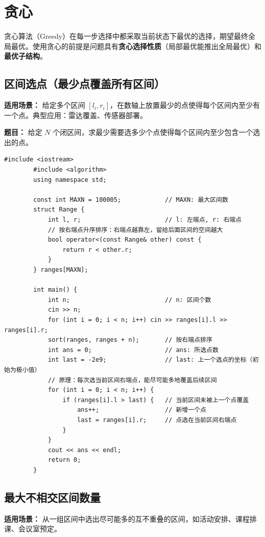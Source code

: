 \documentclass[12pt,a4paper]{ctexart}
\begin{document}
	\newpage
	
	\section{贪心}
	贪心算法（Greedy）在每一步选择中都采取当前状态下最优的选择，期望最终全局最优。使用贪心的前提是问题具有\textbf{贪心选择性质}（局部最优能推出全局最优）和\textbf{最优子结构}。
	
	\subsection{区间选点（最少点覆盖所有区间）}
	\textbf{适用场景：} 给定多个区间 $[l_i, r_i]$，在数轴上放置最少的点使得每个区间内至少有一个点。典型应用：雷达覆盖、传感器部署。
	
	\textbf{题目：} 给定 $N$ 个闭区间，求最少需要选多少个点使得每个区间内至少包含一个选出的点。
	
	\begin{lstlisting}[caption={贪心——按右端点排序，每次选右端点}]
		#include <iostream>
		#include <algorithm>
		using namespace std;
		
		const int MAXN = 100005;            // MAXN: 最大区间数
		struct Range {
			int l, r;                       // l: 左端点, r: 右端点
			// 按右端点升序排序：右端点越靠左，留给后面区间的空间越大
			bool operator<(const Range& other) const {
				return r < other.r;
			}
		} ranges[MAXN];
		
		int main() {
			int n;                          // n: 区间个数
			cin >> n;
			for (int i = 0; i < n; i++) cin >> ranges[i].l >> ranges[i].r;
			sort(ranges, ranges + n);       // 按右端点排序
			int ans = 0;                    // ans: 所选点数
			int last = -2e9;                // last: 上一个选点的坐标（初始为极小值）
			// 原理：每次选当前区间右端点，能尽可能多地覆盖后续区间
			for (int i = 0; i < n; i++) {
				if (ranges[i].l > last) {   // 当前区间未被上一个点覆盖
					ans++;                  // 新增一个点
					last = ranges[i].r;     // 点选在当前区间右端点
				}
			}
			cout << ans << endl;
			return 0;
		}
	\end{lstlisting}
	
	\subsection{最大不相交区间数量}
	\textbf{适用场景：} 从一组区间中选出尽可能多的互不重叠的区间，如活动安排、课程排课、会议室预定。
	
\end{document}
